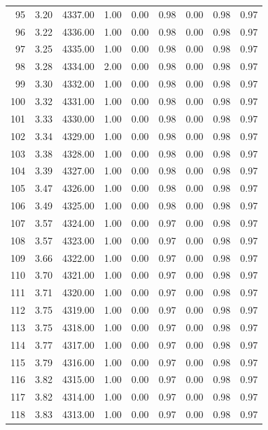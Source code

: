 \documentclass{article}\usepackage[]{graphicx}\usepackage[]{color}
\begin{document}
\begin{longtable}{rrrrrrrrr}
  95 & 3.20 & 4337.00 & 1.00 & 0.00 & 0.98 & 0.00 & 0.98 & 0.97 \\ 
  96 & 3.22 & 4336.00 & 1.00 & 0.00 & 0.98 & 0.00 & 0.98 & 0.97 \\ 
  97 & 3.25 & 4335.00 & 1.00 & 0.00 & 0.98 & 0.00 & 0.98 & 0.97 \\ 
  98 & 3.28 & 4334.00 & 2.00 & 0.00 & 0.98 & 0.00 & 0.98 & 0.97 \\ 
  99 & 3.30 & 4332.00 & 1.00 & 0.00 & 0.98 & 0.00 & 0.98 & 0.97 \\ 
  100 & 3.32 & 4331.00 & 1.00 & 0.00 & 0.98 & 0.00 & 0.98 & 0.97 \\ 
  101 & 3.33 & 4330.00 & 1.00 & 0.00 & 0.98 & 0.00 & 0.98 & 0.97 \\ 
  102 & 3.34 & 4329.00 & 1.00 & 0.00 & 0.98 & 0.00 & 0.98 & 0.97 \\ 
  103 & 3.38 & 4328.00 & 1.00 & 0.00 & 0.98 & 0.00 & 0.98 & 0.97 \\ 
  104 & 3.39 & 4327.00 & 1.00 & 0.00 & 0.98 & 0.00 & 0.98 & 0.97 \\ 
  105 & 3.47 & 4326.00 & 1.00 & 0.00 & 0.98 & 0.00 & 0.98 & 0.97 \\ 
  106 & 3.49 & 4325.00 & 1.00 & 0.00 & 0.98 & 0.00 & 0.98 & 0.97 \\ 
  107 & 3.57 & 4324.00 & 1.00 & 0.00 & 0.97 & 0.00 & 0.98 & 0.97 \\ 
  108 & 3.57 & 4323.00 & 1.00 & 0.00 & 0.97 & 0.00 & 0.98 & 0.97 \\ 
  109 & 3.66 & 4322.00 & 1.00 & 0.00 & 0.97 & 0.00 & 0.98 & 0.97 \\ 
  110 & 3.70 & 4321.00 & 1.00 & 0.00 & 0.97 & 0.00 & 0.98 & 0.97 \\ 
  111 & 3.71 & 4320.00 & 1.00 & 0.00 & 0.97 & 0.00 & 0.98 & 0.97 \\ 
  112 & 3.75 & 4319.00 & 1.00 & 0.00 & 0.97 & 0.00 & 0.98 & 0.97 \\ 
  113 & 3.75 & 4318.00 & 1.00 & 0.00 & 0.97 & 0.00 & 0.98 & 0.97 \\ 
  114 & 3.77 & 4317.00 & 1.00 & 0.00 & 0.97 & 0.00 & 0.98 & 0.97 \\ 
  115 & 3.79 & 4316.00 & 1.00 & 0.00 & 0.97 & 0.00 & 0.98 & 0.97 \\ 
  116 & 3.82 & 4315.00 & 1.00 & 0.00 & 0.97 & 0.00 & 0.98 & 0.97 \\ 
  117 & 3.82 & 4314.00 & 1.00 & 0.00 & 0.97 & 0.00 & 0.98 & 0.97 \\ 
  118 & 3.83 & 4313.00 & 1.00 & 0.00 & 0.97 & 0.00 & 0.98 & 0.97 \\ 

\end{longtable}
\end{document}
